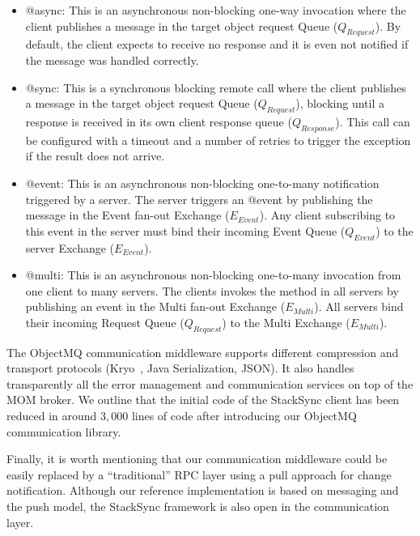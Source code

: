 \begin{itemize}

\item @async:  This is an asynchronous non-blocking  one-way invocation where the client  publishes a message in the target object request 
Queue ($Q_{Request}$). By default, the client expects to receive no response and it is even not notified if the message was handled correctly.


\item @sync:  This is a synchronous blocking remote call where the client publishes a message in the target object
request Queue ($Q_{Request}$), blocking until a response is received in its own client response queue ($Q_{Response}$).  
This call can be configured with a timeout and a number of retries to trigger the exception if the result does not arrive.

\item @event:  This is an asynchronous non-blocking one-to-many notification triggered by a server.  The server triggers an @event by publishing the message in  the Event  fan-out Exchange ($E_{Event}$). Any client subscribing to this event in the server must bind their incoming Event Queue ($Q_{Event}$) to the server Exchange ($E_{Event}$).

\item @multi: This is an asynchronous non-blocking one-to-many invocation from one client to many servers. The clients invokes the method in all servers by publishing an event in the Multi  fan-out Exchange ($E_{Multi}$). All servers bind their incoming Request Queue ($Q_{Request}$) to the Multi Exchange ($E_{Multi}$).

   
\end{itemize}


The ObjectMQ communication middleware supports different compression and transport protocols (Kryo~\cite{kryo}, Java Serialization, JSON). It also handles transparently all the error management and communication services on top of the MOM broker. We outline that the initial code of the StackSync client has been reduced in around $3,000$ lines of code after introducing our ObjectMQ communication library. 

Finally, it is worth mentioning that our communication middleware could be easily replaced by a ``traditional'' RPC layer using a pull approach for change notification. Although our reference implementation is based on messaging and the push model, the StackSync framework is also open in the 
communication layer.


